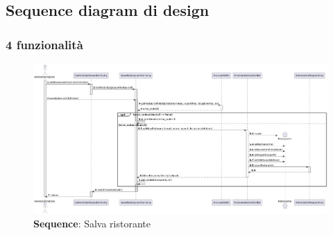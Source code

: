 \subsection{Sequence diagram di design}

\subsubsection{4 funzionalità}
\begin{flushleft}


\end{flushleft}


\begin{figure}[H]
    \centering
    \includegraphics[scale=0.3]{assets/diagrammi/Sequence di design/Salva Ristorante.png}
    \caption{\textbf{Sequence}: Salva ristorante}\label{fig:seq_save_rest}
\end{figure}